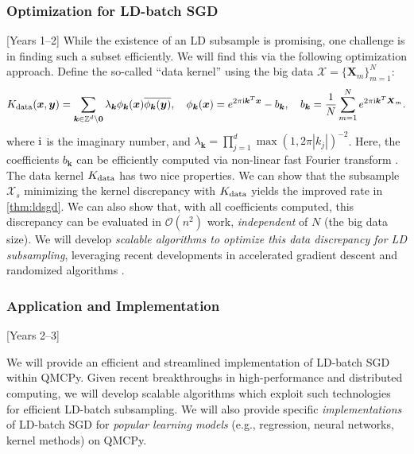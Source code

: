 \documentclass[11pt]{NSFamsart}
\newcommand{\cmtS}[1]{{\color{blue}{(Simon: #1)}}}
\newcommand{\bx}{{\boldsymbol{x}}}
\newcommand{\bX}{{\boldsymbol{X}}}
\newcommand{\bk}{{\boldsymbol{k}}}
\newcommand{\by}{{\boldsymbol{y}}}
\begin{document}
\subsubsection{Optimization for LD-batch SGD} [Years 1--2]
While the existence of an LD subsample is promising, one challenge is in finding such a subset efficiently. We will find this via the following optimization approach. Define the so-called ``data kernel'' using the big data $\mathcal{X} = \{\bX_m\}_{m=1}^N$:
\begin{equation}
K_{\rm data}(\bx,\by) = \sum_{\bk \in \mathbb{Z}^d \setminus \mathbf{0}} \lambda_{\bk} \phi_{\bk}(\bx)\overline{\phi_{\bk}(\by)}, \quad \phi_{\bk}(\bx) = e^{2 \pi {\rm i} \bk^T\bx} - b_{\bk}, \quad b_{\bk} = \frac{1}{N} \sum_{m=1}^N e^{2 \pi {\rm i} \bk^T\bX_m}.
\end{equation}
where ${\rm i}$ is the imaginary number, and $\lambda_{\bk}=\prod_{j=1}^d \max(1,2\pi|k_j|)^{-2}$. Here, the coefficients $b_{\bk}$ can be efficiently computed via non-linear fast Fourier transform \citep{wahls2015fast}. The data kernel $K_{\rm data}$ has two nice properties. We can show that the subsample $\mathcal{X}_s$ minimizing the kernel discrepancy with $K_{\rm data}$ yields the improved rate in \cref{thm:ldsgd}. We can also show that, with all coefficients computed, this discrepancy can be evaluated in $\mathcal{O}(n^2)$ work, \textit{independent} of $N$ (the big data size). We will develop \textit{scalable algorithms to optimize this data discrepancy for LD subsampling}, leveraging recent developments in accelerated gradient descent \citep{jin2018accelerated} and randomized algorithms \citep{mahoney2011randomized}.

\subsubsection{Application and Implementation}
[Years 2--3]

\cmtS{Discuss UAV application with preliminary results, where we're trying to build emulators for real-time control via virtual engines (digital twins). We need these virtual engines (with emulators) to provide robust and real-time control in milliseconds. There are $n \approx 25,000$ data points for curve emulation, and we need to achieve this quickly. Some preliminary results.}

\cmtS{move later} We will provide an efficient and streamlined implementation of LD-batch SGD within QMCPy. Given recent breakthroughs in high-performance and distributed computing, we will develop scalable algorithms which exploit such technologies for efficient LD-batch subsampling. We will also provide specific \textit{implementations} of LD-batch SGD for \textit{popular learning models} (e.g., regression, neural networks, kernel methods) on QMCPy.
\end{document}
